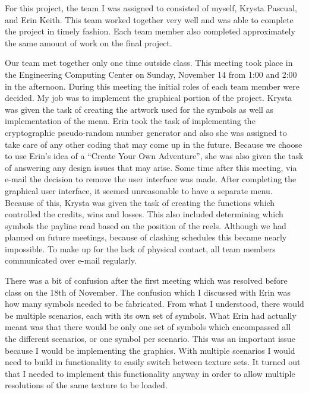   For this project, the team I was assigned to consisted of myself, Krysta Pascual, and Erin Keith.  This team worked together very well and was able to complete the project in timely fashion.  Each team member also completed approximately the same amount of work on the final project.

    Our team met together only one time outside class.  This meeting took place in the Engineering Computing Center on Sunday, November 14 from 1:00 and 2:00 in the afternoon. During this meeting the initial roles of each team member were decided.  My job was to implement the graphical portion of the project. Krysta was given the task of creating the artwork used for the symbols as well as implementation of the menu.  Erin took the task of implementing the cryptographic pseudo-random number generator and also she was assigned to take care of any other coding that may come up in the future.  Because we choose to use Erin's idea of a  “Create Your Own Adventure”, she was also given the task of answering any design issues that may arise. 
      Some time after this meeting, via e-mail the decision to remove the user interface was made. After completing the graphical user interface, it seemed unreasonable to have a separate menu.  Because of this, Krysta was given the task of creating the functions which controlled the credits, wins and losses. This also included determining which symbols the payline read based on the position of the reels.  Although we had planned on future meetings, because of clashing schedules this became nearly impossible.  To make up for the lack of physical contact, all team members communicated over e-mail regularly.

        There was a bit of confusion after the first meeting which was resolved before class on the 18th of November.  The confusion which I discussed with Erin was how many symbols needed to be fabricated.  From what I understood, there would be multiple scenarios, each with its own set of symbols.  What Erin had actually meant was that there would be only one set of symbols which encompassed all the different scenarios, or one symbol per scenario.  This was an important issue because I would be implementing the graphics. With multiple scenarios I would need to build in functionality to easily switch between texture sets.  It turned out that I needed to implement this functionality anyway in order to allow multiple resolutions of the same texture to be loaded.

